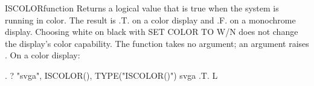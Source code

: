 \begin{XbaseEntry}{ISCOLOR}{function}
Returns a logical value that is true when the system is running in color.
\Syntax
{}
\Usage
The result is .T. on a color display and .F. on a monochrome display.
Choosing white on black with SET COLOR TO W/N does not change the display's
color capability. The function takes no argument; an argument raises
.
\Examples
On a color display:
\begin{TypeIn}
. ? "svga", ISCOLOR(), TYPE("ISCOLOR()")
svga .T. L
\end{TypeIn}
\end{XbaseEntry}


